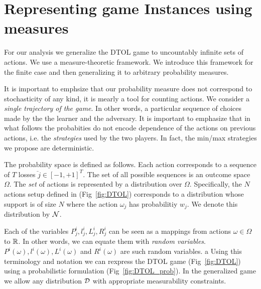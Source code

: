 \documentclass{article}[12pt]
\begin{document}
\section{Representing game Instances using measures}
For our analysis we generalize the DTOL game to uncountably infinite
sets of actions.  We use a measure-theoretic framework. We introduce
this framework for the finite case and then generalizing it to
arbitrary probability measures.

It is important to emphsize that our probability measure does not
correspond to stochasticity of any kind, it is mearly a tool for
counting actions.  We consider a {\em single trajectory of the
  game}. In other words, a particular sequence of choices made by the
the learner and the adversary. It is important to emphasize that in
what follows the probabities do not encode dependence of the actions
on previous actions, i.e. the {\em strategies} used by the two
players. In fact, the min/max strategies we propose are deterministic.

\newcommand{\Ndist}{{\cal N}}

The probability space is defined as follows. Each action corresponds
to a sequence of $T$ losses $\lvec{j} \in [-1,+1]^T$. The set of all
possible sequences is an outcome space $\Omega$. The {\em set} of
actions is represented by a distribution over $\Omega$. Specifically,
the $N$ actions setup defined in (Fig~\ref{fig:DTOL}) corresponds to a
distribution whose support is of size $N$ where the action $\omega_j$
has probabilitiy $w_j$. We denote this distribution by $\Ndist$.

Each of the variables $P_j^i, l_j^i, L_j^i, R_j^i$ can be seen as a
mappings from actions $\omega \in \Omega$ to $\mathbb{R}$.  In other
words, we can equate them with {\em random variables}.
$P^i(\omega), l^i(\omega), L^i(\omega)$ and $ R^i(\omega)$ are such
random variables.  a Using this terminology and notation we can
rexpress the DTOL game (Fig~\ref{fig:DTOL}) using a probabilistic
formulation (Fig~\ref{fig:DTOL_prob}).  In the generalized game we
allow any distribution $\D$ with appropriate measurability
constraints.


\renewcommand{\D}{{\cal D}}
\end{document}
